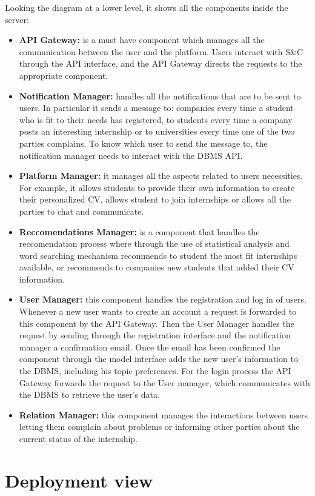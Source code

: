 Looking the diagram at a lower level, it shows all the components inside the server:
\begin{itemize}
    \item \textbf{API Gateway:} is a must have component which manages all the communication between the user and the platform. Users interact with S\&C through the API interface, and the API Gateway directs the requests to the appropriate component. 
    \item \textbf{Notification Manager:} handles all the notifications that are to be sent to users. In particular it sends a message to: companies every time a student who is fit to their needs has registered, to students every time a company posts an interesting internship or to universities every time one of the two parties complains. To know which user to send the message to, the notification manager needs to interact with the DBMS API. 
    \item\textbf{Platform Manager:} it manages all the aspects related to users necessities. For example, it allows students to provide their own information to create their personalized CV, allows student to join internships or allows all the parties to chat and communicate.
    \item \textbf{Reccomendations Manager:} is a component that handles the reccomendation process where through the use of statistical analysis and word searching mechanism recommends to student the most fit internships available, or recommends to companies new students that added their CV information.
    \item\textbf{User Manager:} this component handles the registration and log in of users. Whenever a new user wants to create an account a request is forwarded to this component by the API Gateway. Then the User Manager handles the request by sending through the registration interface and the notification manager a confirmation email. Once the email has been confirmed the component through the model interface adds the new user's information to the DBMS, including his topic preferences. For the login process the API Gateway forwards the request to the User manager, which communicates with the  DBMS to retrieve the user's data.
    \item \textbf{Relation Manager:} this component manages the interactions between users letting them complain about problems or informing other parties about the current status of the internship.
\end{itemize}

\section{Deployment view}

